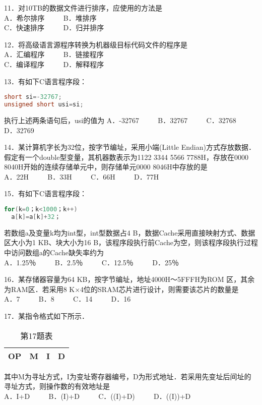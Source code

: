 11．对10TB的数据文件进行排序，应使用的方法是 \\
A．希尔排序 $\qquad$ B．堆排序 \\
C．快速排序 $\qquad$ D．归并排序

12．将高级语言源程序转换为机器级目标代码文件的程序是 \\
A．汇编程序 $\qquad$ B．链接程序 \\
C．编译程序 $\qquad$ D．解释程序

13．有如下C语言程序段： \\
\begin{lstlisting}[language=cpp]
short si=-32767;
unsigned short usi=si;
\end{lstlisting}
执行上述两条语句后，usi的值为
A．-32767 $\qquad$ B．32767 $\qquad$ C．32768 $\qquad$ D．32769

14．某计算机字长为32位，按字节编址，采用小端(Little Endian)方式存放数据．假定有一个double型变量，其机器数表示为1122 3344 5566 7788H，存放在0000 8040H开始的连续存储单元中，则存储单元0000 8046H中存放的是 \\
A．22H $\qquad$ B．33H $\qquad$ C．66H $\qquad$ D．77H

15．有如下C语言程序段： \\
\begin{lstlisting}[language=cpp]
for(k=0；k<1000；k++)
  a[k]=a[k]+32；
\end{lstlisting}
若数组a及变量k均为int型，int型数据占4 B，数据Cache采用直接映射方式、数据区大小为1 KB、块大小为16 B，该程序段执行前Cache为空，则该程序段执行过程中访问数组a的Cache缺失率约为 \\
A．1.25％ $\qquad$ B．2.5％ $\qquad$ C．12.5％ $\qquad$ D．25％

16．某存储器容量为64 KB，按字节编址，地址4000H～5FFFH为ROM 区，其余为RAM区．若采用8 K×4位的SRAM芯片进行设计，则需要该芯片的数量是 \\
A．7 $\qquad$ B．8 $\qquad$ C．14 $\qquad$ D．16

17．某指令格式如下所示．
\begin{table}[ht]
\centering
\caption{第17题表}\label{CSN16_tab3}
\begin{tabular}{|c|c|c|c|}
\hline
OP & M & I & D \\
\hline
\end{tabular}
\end{table}
其中M为寻址方式，I为变址寄存器编号，D为形式地址．若采用先变址后间址的寻址方式，则操作数的有效地址是 \\
A．I+D $\qquad$ B．(I)+D $\qquad$ C．((I)+D) $\qquad$ D．((I))+D

